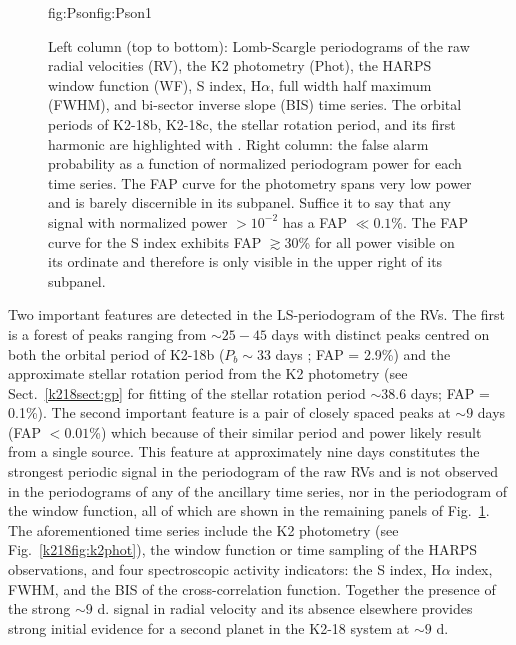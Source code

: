 \begin{figure}
\begin{ocg}{fig:Pson}{fig:Pson}{1}
  \end{ocg}
  \hspace{-0.8\hsize}%
  \caption{Left column (top to bottom):
  Lomb-Scargle periodograms of the raw radial velocities (RV), the K2 photometry (Phot), the HARPS window
  function (WF), S index, H$\alpha$, full width half maximum (FWHM), and bi-sector inverse slope (BIS)
  time series. The orbital periods of K2-18b, K2-18c, the stellar rotation
  period, and its first harmonic are highlighted with
  .
  Right column: the false alarm probability as a function of normalized periodogram power for each
  time series. The FAP curve for the photometry spans very low power and is barely discernible in its
  subpanel. Suffice it to say that any signal with normalized power $> 10^{-2}$ has a FAP $\ll 0.1$\%.
  The FAP curve for the S index exhibits FAP $\gtrsim 30$\% for all power visible on its ordinate and 
  therefore is only visible in the upper right of its subpanel.}
  \label{k218fig:periodograms}
\end{figure}


Two important features are detected in the LS-periodogram of the RVs.
The first is a forest of peaks ranging from 
$\sim 25-45$ days with distinct peaks centred on both the orbital period of K2-18b
($P_b \sim 33$ days ; FAP = 2.9\%) and the approximate stellar
rotation period from the K2 photometry (see Sect.~\ref{k218sect:gp} for fitting of the
stellar rotation period \prot{} $\sim 38.6$ days;
FAP = 0.1\%). The second important feature is a pair of closely spaced peaks
at $\sim 9$ days (FAP $<0.01$\%) which because of their similar period and power
likely result from a single source. This feature at approximately nine days
constitutes the strongest periodic signal in the
periodogram of the raw RVs and is not observed in the periodograms of any of the ancillary
time series, nor in the periodogram of the window function, all of which are
shown in the remaining panels of Fig.~\ref{k218fig:periodograms}. The aforementioned time series
include the K2 photometry (see Fig.~\ref{k218fig:k2phot}), the window function or
time sampling of the HARPS observations, and four spectroscopic activity indicators:
the S index, H$\alpha$ index, FWHM, and the BIS of the cross-correlation function. 
Together the presence of the strong $\sim 9$ d. signal in radial velocity
and its absence elsewhere provides strong initial evidence for a second planet in the K2-18
system at $\sim 9$ d.


